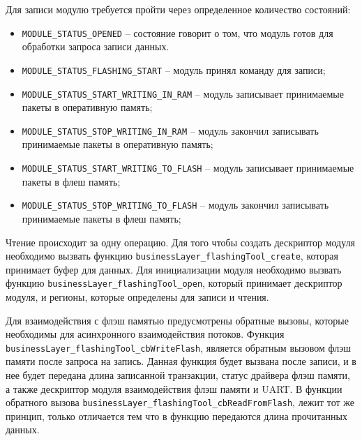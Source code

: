 Для записи модулю требуется пройти через определенное количество состояний: 

\begin{itemize}
    \item \lstinline|MODULE_STATUS_OPENED| -- состояние говорит о том, что модуль готов для обработки запроса записи данных.
    \item \lstinline|MODULE_STATUS_FLASHING_START| -- модуль принял команду для записи;
    \item \lstinline|MODULE_STATUS_START_WRITING_IN_RAM| -- модуль записывает принимаемые пакеты в оперативную память;
    \item \lstinline|MODULE_STATUS_STOP_WRITING_IN_RAM| -- модуль закончил записывать принимаемые пакеты в оперативную память;
    \item \lstinline|MODULE_STATUS_START_WRITING_TO_FLASH| -- модуль записывает принимаемые пакеты в флеш память;
    \item \lstinline|MODULE_STATUS_STOP_WRITING_TO_FLASH| -- модуль закончил записывать принимаемые пакеты в флеш память;
\end{itemize}

Чтение происходит за одну операцию.
Для того чтобы создать дескриптор модуля необходимо вызвать функцию \lstinline|businessLayer_flashingTool_create|, которая принимает буфер для данных. Для инициализации модуля
необходимо вызвать функцию \lstinline|businessLayer_flashingTool_open|, который принимает дескриптор модуля, и регионы, которые определены для
записи и чтения.

Для взаимодействия с флэш памятью предусмотрены обратные вызовы, которые необходимы для асинхронного взаимодействия потоков. 
Функция \lstinline|businessLayer_flashingTool_cbWriteFlash|, является обратным вызовом флэш памяти после запроса на запись.
Данная функция будет вызвана после записи, и в нее будет передана длина записанной транзакции, статус драйвера флэш памяти, а
также дескриптор модуля взаимодействия флэш памяти и UART. В функции обратного вызова \lstinline|businessLayer_flashingTool_cbReadFromFlash|,
лежит тот же принцип, только отличается тем что в функцию передаются длина прочитанных данных.

